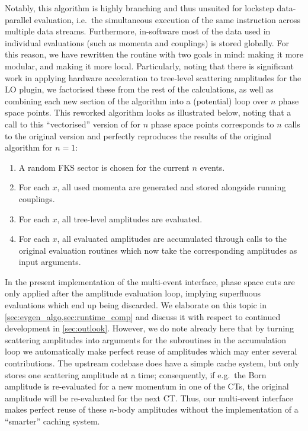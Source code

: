 \documentclass[a4paper,11pt]{article}
\begin{document}
Notably, this algorithm is highly branching and thus unsuited for lockstep data-parallel evaluation, i.e.\ the simultaneous execution of the same instruction across multiple data streams. Furthermore, in-software most of the data used in individual evaluations (such as momenta and couplings) is stored globally. For this reason, we have rewritten the \sigintf routine with two goals in mind: making it more modular, and making it more local. Particularly, noting that there is significant work in applying hardware acceleration to tree-level scattering amplitudes for the LO \cudacpp{} plugin, we factorised these from the rest of the calculations, as well as combining each new section of the algorithm into a (potential) loop over $n$ phase space points. This reworked algorithm looks as illustrated below, noting that a call to this ``vectorised'' version of \sigintf for $n$ phase space points corresponds to $n$ calls to the original version and perfectly reproduces the results of the original algorithm for $n=1$:
\begin{enumerate}
    \item A random FKS sector is chosen for the current $n$ events.
    \item For each $x$, all used momenta are generated and stored alongside running couplings.
    \item For each $x$, all tree-level amplitudes are evaluated.
    \item For each $x$, all evaluated amplitudes are accumulated through calls to the original evaluation routines which now take the corresponding amplitudes as input arguments.
\end{enumerate}

In the present implementation of the multi-event interface, phase space cuts are only applied after the amplitude evaluation loop, implying superfluous evaluations which end up being discarded. We elaborate on this topic in \cref{sec:evgen_algo,sec:runtime_comp} and discuss it with respect to continued development in \cref{sec:outlook}. However, we do note already here that by turning scattering amplitudes into arguments for the subroutines in the accumulation loop we automatically make perfect reuse of amplitudes which may enter several contributions. The upstream \mg{} codebase does have a simple cache system, but only stores one scattering amplitude at a time; consequently, if e.g.\ the Born amplitude is re-evaluated for a new momentum in one of the CTs, the original amplitude will be re-evaluated for the next CT. Thus, our multi-event interface makes perfect reuse of these $n$-body amplitudes without the implementation of a ``smarter'' caching system.
\end{document}
